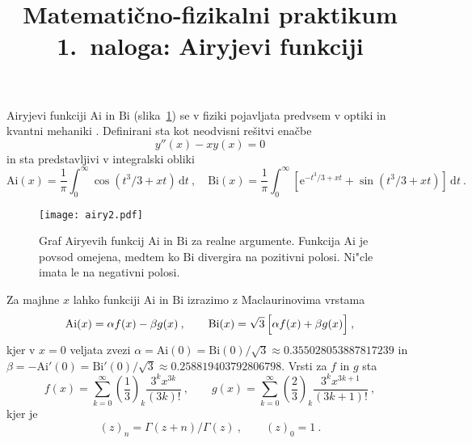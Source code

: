 \documentclass[slovene,11pt,a4paper]{article}
\title{
\sc\large Matematično-fizikalni praktikum\\
\bigskip
\bf\Large 1.~naloga: Airyjevi funkciji}
\author{}
\date{}
\newcommand{\dd}{\,\mathrm{d}}
\newcommand{\Ai}{\mathrm{Ai}}
\newcommand{\Bi}{\mathrm{Bi}}
\begin{document}
\maketitle
\vspace{-1cm}

Airyjevi funkciji $\Ai$ in $\Bi$ (slika~\ref{sl:airy})
se v fiziki pojavljata predvsem v optiki in kvantni mehaniki
\cite{1_vallee}.  Definirani sta kot neodvisni rešitvi enačbe
%
\begin{equation*}
  y''(x) -xy(x) = 0
\end{equation*}
%
in sta predstavljivi v integralski obliki
%
\begin{equation*}
  \Ai(x) = \frac{1}{\pi} \int_0^\infty \cos (t^3/3 + x t) \dd t \>,\quad
  \Bi(x) = \frac{1}{\pi} \int_0^\infty \left[ \mathrm{e}^{-t^3/3 + x t}
  + \sin (t^3/3 + x t) \right] \dd t \>.
\end{equation*}
%

\begin{figure}[hbtp]
\begin{center}
\texttt{[image: airy2.pdf]}
\end{center}
\vspace*{-7mm}
\caption{Graf Airyevih funkcij $\Ai$ in $\Bi$ za realne
argumente.  Funkcija $\Ai$ je povsod omejena,
medtem ko $\Bi$ divergira na pozitivni polosi.
Ni"cle imata le na negativni polosi.}
\label{sl:airy}
\end{figure}

Za majhne $x$ lahko funkciji $\Ai$ in $\Bi$ izrazimo
z Maclaurinovima vrstama
%
\begin{equation*}
  \Ai(x) = \alpha f(x) - \beta g(x)\>,\qquad
  \Bi(x) = \sqrt{3}\, \Bigl[\alpha f (x) + \beta g(x) \Bigr]\>,
\end{equation*}
kjer v $x=0$ veljata zvezi
%
$\alpha = \Ai(0) = \Bi(0)/\sqrt{3}\approx 0.355028053887817239$ in
$\beta = -\Ai'(0) = \Bi'(0)/\sqrt{3}\approx 0.258819403792806798$.
Vrsti za $f$ in $g$ sta
\begin{equation*}
  f(x) = \sum_{k=0}^\infty
  \left(\frac{1}{3}\right)_k \frac{3^k x^{3k}}{(3k)!} \>, \qquad
  g(x) = \sum_{k=0}^\infty
  \left(\frac{2}{3}\right)_k \frac{3^k x^{3k+1}}{(3k+1)!} \>,
\end{equation*}
kjer je
\begin{equation*}
  (z)_n = \Gamma(z+n)/\Gamma(z) \>, \qquad (z)_0 = 1 \>.
\end{equation*}
\end{document}
